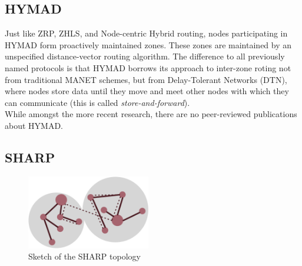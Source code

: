 \documentclass[a4paper,10pt]{scrartcl}
\begin{document}
\subsection{\gls{HYMAD}}
\label{subsec:hymad}
Just like ZRP, ZHLS, and Node-centric Hybrid routing, nodes participating in HYMAD \cite{HYMAD} form proactively maintained zones. These zones are maintained by an unspecified distance-vector routing algorithm.
The difference to all previously named protocols is that HYMAD borrows its approach to inter-zone roting not from traditional \gls{MANET} schemes, but from Delay-Tolerant Networks (DTN), where nodes store data until they move and meet other nodes with which they can communicate (this is called \emph{store-and-forward}).\\
While amongst the more recent research, there are no peer-reviewed publications about HYMAD.


\subsection{\gls{SHARP}}
\label{subsec:sharp}
\begin{figure}
  \begin{center}
    \includegraphics[width=0.48\textwidth]{../images/SHARP}
  \end{center}
  \label{fig:area_centered}
  \caption{Sketch of the SHARP topology}
\end{figure}
\end{document}
